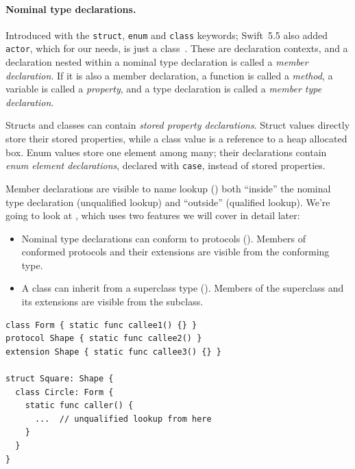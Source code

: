 \documentclass[../generics]{subfiles}
\begin{document}
\paragraph{Nominal type declarations.}
Introduced with the \texttt{struct}, \texttt{enum} and \texttt{class} keywords; Swift~5.5 also added \texttt{actor}, which for our needs, is just a class~\cite{se0306}. These are declaration contexts, and a declaration nested within a nominal type declaration is called a \emph{member declaration}. If it is also a member declaration, a function is called a \emph{method}, a variable is called a \emph{property}, and a type declaration is called a \emph{member type declaration}.

Structs and classes can contain \emph{stored property declarations}. Struct values directly store their stored properties, while a class value is a reference to a heap allocated box. Enum values store one element among many; their declarations contain \emph{enum element declarations}, declared with \texttt{case}, instead of stored properties.

Member declarations are visible to name lookup () both ``inside'' the nominal type declaration (unqualified lookup) and ``outside'' (qualified lookup). We're going to look at , which uses two features we will cover in detail later:
\begin{itemize}
\item Nominal type declarations can conform to protocols (). Members of conformed protocols and their extensions are visible from the conforming type.
\item A class can inherit from a superclass type (). Members of the superclass and its extensions are visible from the subclass.
\end{itemize}

\begin{listing}\label{unqualified lookup listing}
\begin{Verbatim}
class Form { static func callee1() {} }
protocol Shape { static func callee2() }
extension Shape { static func callee3() {} }

struct Square: Shape {
  class Circle: Form {
    static func caller() {
      ...  // unqualified lookup from here
    }
  }
}
\end{Verbatim}
\end{listing}
\end{document}
